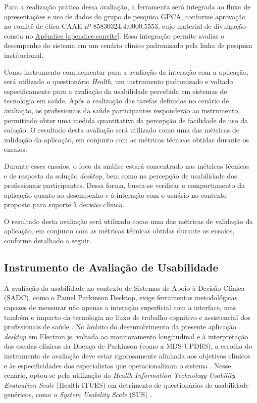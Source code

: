 Para a realização prática dessa avaliação, a ferramenta será integrada ao fluxo de apresentações e uso de dados do grupo de pesquisa GPCA, conforme aprovação no comitê de ética CAAE nº 85830324.4.0000.5553, cujo material de divulgação consta no \hyperref[apendice:convite]{Apêndice \ref*{apendice:convite}}. Essa integração permite avaliar o desempenho do sistema em um cenário clínico padronizado pela linha de pesquisa institucional.

Como instrumento complementar para a avaliação da interação com a aplicação, será utilizado o questionário \textit{Health}, um instrumento padronizado e voltado especificamente para a avaliação da usabilidade percebida em sistemas de tecnologia em saúde. Após a realização das tarefas definidas no cenário de avaliação, os profissionais da saúde participantes responderão ao instrumento, permitindo obter uma medida quantitativa da percepção de facilidade de uso da solução. O resultado desta avaliação será utilizado como uma das métricas de validação da aplicação, em conjunto com as métricas técnicas obtidas durante os ensaios.

Durante esses ensaios, o foco da análise estará concentrado nas métricas técnicas e de resposta da solução \textit{desktop}, bem como na percepção de usabilidade dos profissionais participantes. Dessa forma, busca-se verificar o comportamento da aplicação quanto ao desempenho e à interação com o usuário no contexto proposto para suporte à decisão clínica.

O resultado desta avaliação será utilizado como uma das métricas de validação da aplicação, em conjunto com as métricas técnicas obtidas durante os ensaios, conforme detalhado a seguir.

\subsection{Instrumento de Avaliação de Usabilidade} 

A avaliação da usabilidade no contexto de Sistemas de Apoio à Decisão Clínica (SADC), como o Painel Parkinson Desktop, exige ferramentas metodológicas capazes de mensurar não apenas a interação superficial com a interface, mas também o impacto da tecnologia no fluxo de trabalho cognitivo e assistencial dos profissionais de saúde \cite{RussJara2025}. No âmbito do desenvolvimento da presente aplicação \textit{desktop} em Electron.js, voltada ao monitoramento longitudinal e à interpretação das escalas clínicas da Doença de Parkinson (como a MDS-UPDRS), a escolha do instrumento de avaliação deve estar rigorosamente alinhada aos objetivos clínicos e às especificidades dos especialistas que operacionalizam o sistema \cite{RussJara2025}. Nesse cenário, optou-se pela utilização do \textit{Health Information Technology Usability Evaluation Scale} (Health-ITUES) em detrimento de questionários de usabilidade genéricos, como o \textit{System Usability Scale} (SUS) \cite{RussJara2025}.

